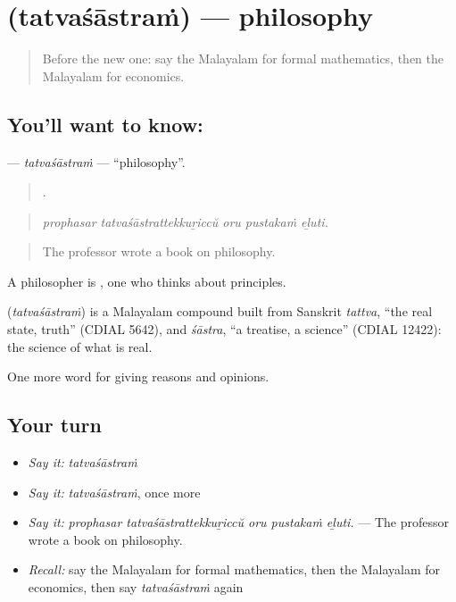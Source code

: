 \section[\texorpdfstring{\ml{തത്വശാസ്ത്രം} (tatvaśāstraṁ)}{തത്വശാസ്ത്രം (tatvaśāstraṁ)}]{ (tatvaśāstraṁ) — philosophy}

\label{lesson:ML-C437-tatvasastram}



\begin{quote}
Before the new one: say the Malayalam for formal mathematics, then the Malayalam for economics.
\end{quote}

\subsection*{You'll want to know: }
\textbf{} — \emph{tatvaśāstraṁ} — \textquotedblleft{}philosophy\textquotedblright{}.

\begin{quote}
    .
\end{quote}

\begin{quote}
\emph{prophasar tatvaśāstrattekkuṟiccŭ oru pustakaṁ eḻuti.}
\end{quote}

\begin{quote}
The professor wrote a book on philosophy.
\end{quote}

A philosopher is , one who thinks about principles.

\begin{cousinweb}
\textbf{} (\emph{tatvaśāstraṁ}) is a Malayalam compound built from Sanskrit \emph{tattva}, \textquotedblleft{}the real state, truth\textquotedblright{} (CDIAL 5642), and \emph{śāstra}, \textquotedblleft{}a treatise, a science\textquotedblright{} (CDIAL 12422): the science of what is real.
\end{cousinweb}

\begin{grammarlens}[title={What you've built}]
One more word for giving reasons and opinions.
\end{grammarlens}

\subsection*{Your turn}
\begin{itemize}
\raggedright
  \item \emph{Say it:} \emph{tatvaśāstraṁ}
  \item \emph{Say it:} \emph{tatvaśāstraṁ}, once more
  \item \emph{Say it:} \emph{prophasar tatvaśāstrattekkuṟiccŭ oru pustakaṁ eḻuti.} — The professor wrote a book on philosophy.
  \item \emph{Recall:} say the Malayalam for formal mathematics, then the Malayalam for economics, then say \emph{tatvaśāstraṁ} again
\end{itemize}

